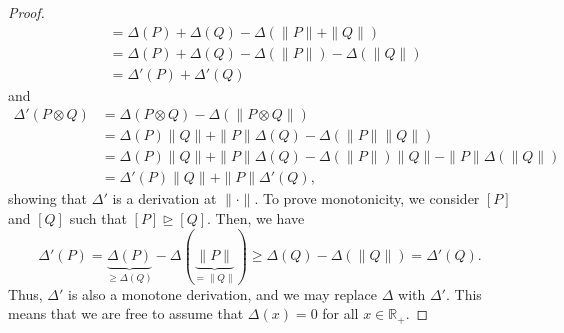 \documentclass[aps,pra,11pt,onecolumn,nofootinbib,tightenlines]{revtex4-2}
\theoremstyle{definition}
\newcommand{\mb}[1]{\mathbb{#1}}
\newcommand{\rgeq}{\trianglerighteq}
\begin{document}
\begin{proof}
\begin{align}
&=\Delta(P)+\Delta(Q)-\Delta(\|P\|+\|Q\|)\\
&=\Delta(P)+\Delta(Q)-\Delta(\|P\|)-\Delta(\|Q\|)\\
&=\Delta'(P)+\Delta'(Q)
\end{align}
and
\begin{align}
\Delta'(P\otimes Q)&=\Delta(P\otimes Q)-\Delta(\|P\otimes Q\|)\\
&=\Delta(P)\|Q\|+\|P\|\Delta(Q)-\Delta(\|P\|\|Q\|)\\
&=\Delta(P)\|Q\|+\|P\|\Delta(Q)-\Delta(\|P\|)\|Q\|-\|P\|\Delta(\|Q\|)\\
&=\Delta'(P)\|Q\|+\|P\|\Delta'(Q),
\end{align}
showing that $\Delta'$ is a derivation at $\|\cdot\|$. To prove monotonicity, we consider $[P]$ and $[Q]$ such that $[P]\rgeq[Q]$. Then, we have
\begin{equation}
\Delta'(P)=\underbrace{\Delta(P)}_{\geq\Delta(Q)}-\Delta(\underbrace{\|P\|}_{=\|Q\|})\geq\Delta(Q)-\Delta(\|Q\|)=\Delta'(Q).
\end{equation}
Thus, $\Delta'$ is also a monotone derivation, and we may replace $\Delta$ with $\Delta'$. This means that we are free to assume that $\Delta(x)=0$ for all $x\in\mb R_+$.


\end{proof}
\end{document}

